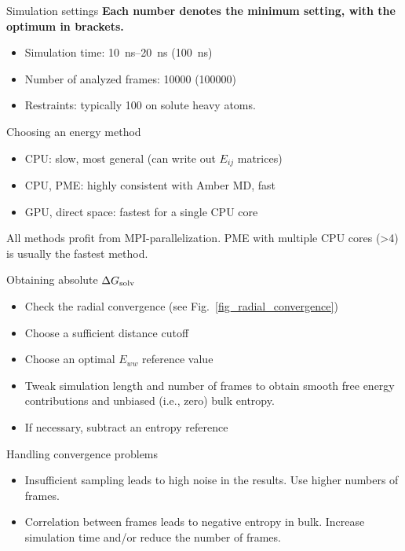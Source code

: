 \documentclass[9pt,tutorial]{livecoms}
\begin{document}
\begin{Checklists}[H]
	
	\begin{checklist}{Simulation settings}
		\textbf{Each number denotes the minimum setting, with the optimum in brackets.}
		\begin{itemize}
			\item Simulation time: \SIrange{10}{20}{\nano\second} (\SI{100}{\nano\second})
			\item Number of analyzed frames: \num{10000} (\num{100000})
			\item Restraints: typically \SI{100}{\kcalPerMolASqr} on solute heavy atoms.
		\end{itemize}
	\end{checklist}
	
	\begin{checklist}{Choosing an energy method}
		\begin{itemize}
			\item CPU: slow, most general (can write out $E_{ij}$ matrices)
			\item CPU, PME: highly consistent with Amber MD, fast
			\item GPU, direct space: fastest for a single CPU core
		\end{itemize}
	   
	All methods profit from MPI-parallelization.   
	PME with multiple CPU cores (>4) is usually the fastest method.
	\end{checklist}
	
	\begin{checklist}{Obtaining absolute $\Delta G_\textup{solv}$}
		\begin{itemize}
			\item Check the radial convergence (see Fig.~\ref{fig_radial_convergence})
			\item Choose a sufficient distance cutoff
			\item Choose an optimal $E_{ww}$ reference value
			\item Tweak simulation length and number of frames to obtain smooth free energy contributions and unbiased (i.e., zero) bulk entropy.
			\item If necessary, subtract an entropy reference
		\end{itemize}
	\end{checklist}
	
	\begin{checklist}{Handling convergence problems}
		\begin{itemize}
			\item Insufficient sampling leads to high noise in the results. Use higher numbers of frames.
			\item Correlation between frames leads to negative entropy in bulk. Increase simulation time and/or reduce the number of frames.
		\end{itemize}
	\end{checklist}
	

\end{Checklists}
\end{document}

